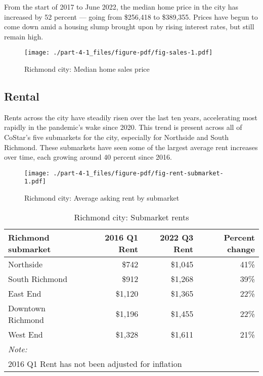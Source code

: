 \documentclass[
  letterpaper,
  DIV=11,
  numbers=noendperiod]{scrreprt}
\begin{document}
From the start of 2017 to June 2022, the median home price in the city
has increased by 52 percent --- going from \$256,418 to \$389,355.
Prices have begun to come down amid a housing slump brought upon by
rising interest rates, but still remain high.

\begin{figure}

{\centering \texttt{[image: ./part-4-1\_files/figure-pdf/fig-sales-1.pdf]}

}

\caption{\label{fig-sales}Richmond city: Median home sales price}

\end{figure}

\hypertarget{rental}{%
\subsection{Rental}\label{rental}}

Rents across the city have steadily risen over the last ten years,
accelerating most rapidly in the pandemic's wake since 2020. This trend
is present across all of CoStar's five submarkets for the city,
especially for Northside and South Richmond. These submarkets have seen
some of the largest average rent increases over time, each growing
around 40 percent since 2016.

\begin{figure}

{\centering \texttt{[image: ./part-4-1\_files/figure-pdf/fig-rent-submarket-1.pdf]}

}

\caption{\label{fig-rent-submarket}Richmond city: Average asking rent by
submarket}

\end{figure}

\hypertarget{tbl-submarket-table}{}
\begin{table}
\caption{\label{tbl-submarket-table}Richmond city: Submarket rents }\tabularnewline

\centering
\begin{tabular}{l|r|r|r}
\hline
Richmond submarket & 2016 Q1 Rent & 2022 Q3 Rent & Percent change\\
\hline
Northside & \$742 & \$1,045 & 41\%\\
\hline
South Richmond & \$912 & \$1,268 & 39\%\\
\hline
East End & \$1,120 & \$1,365 & 22\%\\
\hline
Downtown Richmond & \$1,196 & \$1,455 & 22\%\\
\hline
West End & \$1,328 & \$1,611 & 21\%\\
\hline
\multicolumn{4}{l}{\rule{0pt}{1em}\textit{Note: }}\\
\multicolumn{4}{l}{\rule{0pt}{1em}2016 Q1 Rent has not been adjusted for inflation}\\
\end{tabular}
\end{table}
\end{document}
